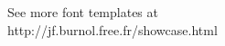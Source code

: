 \documentclass[preview]{standalone}
\begin{document}
\begin{center}
See more font templates at \\ http://jf.burnol.free.fr/showcase.html
\end{center}
\end{document}
